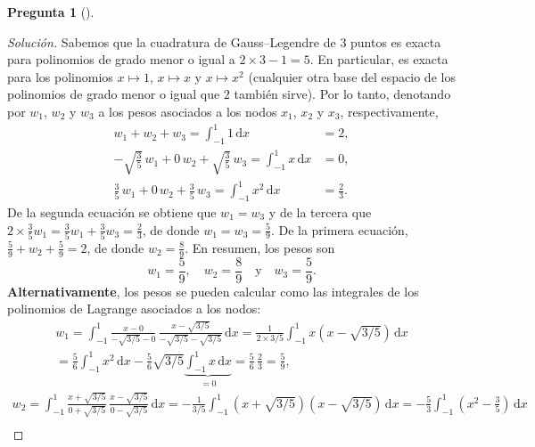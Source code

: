 \documentclass[letter,12pt]{article}
\theoremstyle{definition}
\newtheorem{question}{Pregunta}
\numberwithin{equation}{question}
\newenvironment{solution}{\begin{proof}[Solución]}{\end{proof}}
\begin{document}
\begin{question}[]
\begin{solution}
\smallskip
\noindent{}
Sabemos que la cuadratura de Gauss--Legendre de $3$ puntos es exacta para polinomios de grado menor o igual a $2\times 3 - 1 = 5$.
En particular, es exacta para los polinomios $x \mapsto 1$, $x \mapsto x$ y $x \mapsto x^2$ (cualquier otra base del espacio de los polinomios de grado menor o igual que $2$ también sirve).
Por lo tanto, denotando por $w_1$, $w_2$ y $w_3$ a los pesos asociados a los nodos $x_1$, $x_2$ y $x_3$, respectivamente,
%
\begin{align*}
w_1 + w_2 + w_3 = \int_{-1}^1 1 \, \mathrm{d} x & = 2,\\
-\sqrt{\frac{3}{5}} \, w_1 + 0\,w_2 + \sqrt{\frac{3}{5}} \, w_3 = \int_{-1}^1 x \, \mathrm{d}x & = 0,\\
\frac{3}{5} \, w_1 + 0\,w_2 + \frac{3}{5} \, w_3 = \int_{-1}^1 x^2 \, \mathrm{d}x & = \frac{2}{3}.
\end{align*}
%
De la segunda ecuación se obtiene que $w_1 = w_3$ y de la tercera que $2 \times \frac{3}{5} w_1 = \frac{3}{5} w_1 + \frac{3}{5} w_3 = \frac{2}{3}$, de donde $w_1 = w_3 = \frac{5}{9}$.
De la primera ecuación, $\frac{5}{9} + w_2 + \frac{5}{9} = 2$, de donde $w_2 = \frac{8}{9}$.
En resumen, los pesos son
%
\begin{equation*}
w_1 = \frac{5}{9}, \quad w_2 = \frac{8}{9} \quad\text{y}\quad w_3 = \frac{5}{9}.
\end{equation*}
%
\textbf{Alternativamente}, los pesos se pueden calcular como las integrales de los polinomios de Lagrange asociados a los nodos:
%
\begin{multline*}
w_1 = \int_{-1}^1 \frac{x-0}{-\sqrt{3/5}-0} \, \frac{x-\sqrt{3/5}}{-\sqrt{3/5}-\sqrt{3/5}} \, \mathrm{d}x
= \frac{1}{2 \times 3/5} \int_{-1}^1 x \left(x-\sqrt{3/5}\right) \, \mathrm{d}x\\
= \frac{5}{6} \int_{-1}^1 x^2 \, \mathrm{d} x - \frac{5}{6}\sqrt{3/5} \underbrace{\int_{-1}^1 x \, \mathrm{d}x}_{= 0} = \frac{5}{6} \, \frac{2}{3} = \frac{5}{9},
\end{multline*}
%
\begin{multline*}
w_2 = \int_{-1}^1 \frac{x+\sqrt{3/5}}{0 + \sqrt{3/5}} \, \frac{x-\sqrt{3/5}}{0-\sqrt{3/5}} \, \mathrm{d}x
= -\frac{1}{3/5} \int_{-1}^1 \left(x+\sqrt{3/5}\right) \left(x-\sqrt{3/5}\right) \, \mathrm{d}x
= -\frac{5}{3} \int_{-1}^1 \left(x^2 - \frac{3}{5}\right) \, \mathrm{d}x\\

\end{multline*}
\end{solution}
\end{question}
\end{document}
